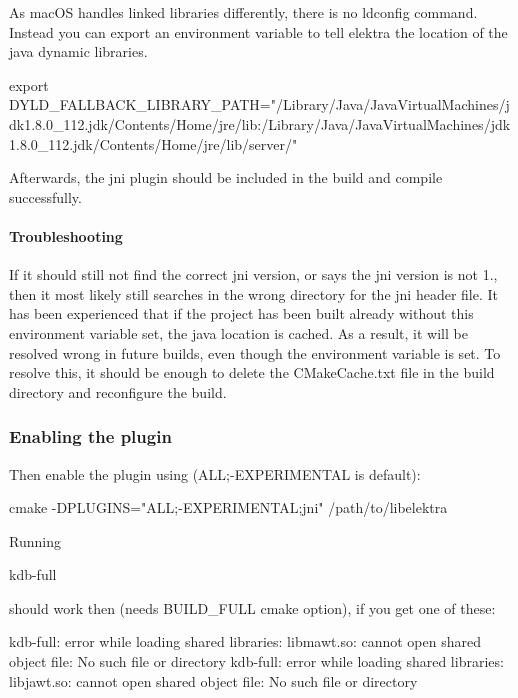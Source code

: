 As mac\+OS handles linked libraries differently, there is no ldconfig command. Instead you can export an environment variable to tell elektra the location of the java dynamic libraries. \begin{DoxyVerb}    export DYLD_FALLBACK_LIBRARY_PATH="/Library/Java/JavaVirtualMachines/jdk1.8.0_112.jdk/Contents/Home/jre/lib:/Library/Java/JavaVirtualMachines/jdk1.8.0_112.jdk/Contents/Home/jre/lib/server/"
\end{DoxyVerb}


Afterwards, the jni plugin should be included in the build and compile successfully.

\paragraph*{Troubleshooting}

If it should still not find the correct jni version, or says the jni version is not 1., then it most likely still searches in the wrong directory for the jni header file. It has been experienced that if the project has been built already without this environment variable set, the java location is cached. As a result, it will be resolved wrong in future builds, even though the environment variable is set. To resolve this, it should be enough to delete the C\+Make\+Cache.\+txt file in the build directory and reconfigure the build.

\subsubsection*{Enabling the plugin}

Then enable the plugin using ({\ttfamily A\+LL;-\/\+E\+X\+P\+E\+R\+I\+M\+E\+N\+T\+AL} is default)\+: \begin{DoxyVerb}cmake -DPLUGINS="ALL;-EXPERIMENTAL;jni" /path/to/libelektra
\end{DoxyVerb}


Running \begin{DoxyVerb}kdb-full
\end{DoxyVerb}


should work then (needs B\+U\+I\+L\+D\+\_\+\+F\+U\+LL cmake option), if you get one of these\+: \begin{DoxyVerb}kdb-full: error while loading shared libraries: libmawt.so: cannot open shared object file: No such file or directory
kdb-full: error while loading shared libraries: libjawt.so: cannot open shared object file: No such file or directory
\end{DoxyVerb}


